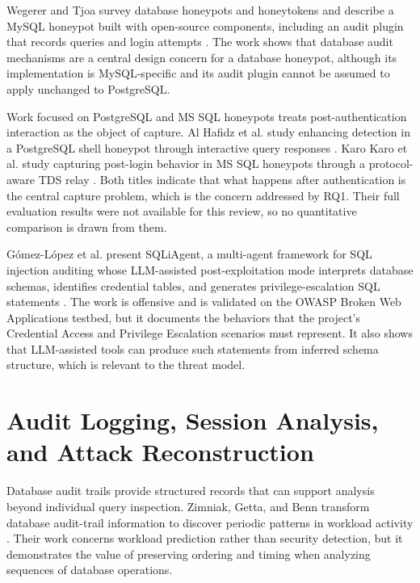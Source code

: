 \documentclass[12pt,a4paper]{report}
\begin{document}
Wegerer and Tjoa survey database honeypots and honeytokens and describe a MySQL honeypot built with open-source components, including an audit plugin that records queries and login attempts \cite{wegerer_defeating_2016}. The work shows that database audit mechanisms are a central design concern for a database honeypot, although its implementation is MySQL-specific and its audit plugin cannot be assumed to apply unchanged to PostgreSQL.

Work focused on PostgreSQL and MS SQL honeypots treats post-authentication interaction as the object of capture. Al Hafidz et al. study enhancing detection in a PostgreSQL shell honeypot through interactive query responses \cite{al_hafidz_enhancing_2025}. Karo Karo et al. study capturing post-login behavior in MS SQL honeypots through a protocol-aware TDS relay \cite{karo_karo_capturing_2025}. Both titles indicate that what happens after authentication is the central capture problem, which is the concern addressed by RQ1. Their full evaluation results were not available for this review, so no quantitative comparison is drawn from them.

Gómez-López et al. present SQLiAgent, a multi-agent framework for SQL injection auditing whose LLM-assisted post-exploitation mode interprets database schemas, identifies credential tables, and generates privilege-escalation SQL statements \cite{gomez-lopez_multi-agent_2026}. The work is offensive and is validated on the OWASP Broken Web Applications testbed, but it documents the behaviors that the project's Credential Access and Privilege Escalation scenarios must represent. It also shows that LLM-assisted tools can produce such statements from inferred schema structure, which is relevant to the threat model.

\section{Audit Logging, Session Analysis, and Attack Reconstruction}
Database audit trails provide structured records that can support analysis beyond individual query inspection. Zimniak, Getta, and Benn transform database audit-trail information to discover periodic patterns in workload activity \cite{zimniak_predicting_2015}. Their work concerns workload prediction rather than security detection, but it demonstrates the value of preserving ordering and timing when analyzing sequences of database operations.
\end{document}
